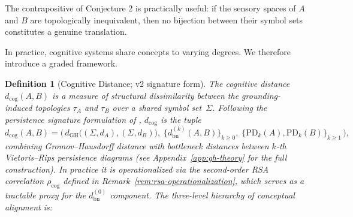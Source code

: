 \documentclass[12pt]{article}
\newtheorem{definition}{Definition}
\begin{document}
The contrapositive of Conjecture 2 is practically useful: if the
sensory spaces of $A$ and $B$ are topologically inequivalent, then no
bijection between their symbol sets constitutes a genuine translation.

In practice, cognitive systems share concepts to varying degrees.
We therefore introduce a graded framework.

\begin{definition}[Cognitive Distance; v2 signature form]
The \emph{cognitive distance} $d_\mathrm{cog}(A, B)$ is a measure of
structural dissimilarity between the grounding-induced topologies
$\tau_A$ and $\tau_B$ over a shared symbol set~$\Sigma$.
Following the persistence signature formulation of
\cite[Def.~\ref{def:dcog-signature}]{minamoto2026topology},
$d_\mathrm{cog}$ is the tuple
\[
  d_\mathrm{cog}(A, B)
  = \Big(\,
      d_\mathrm{GH}\bigl((\Sigma, d_A), (\Sigma, d_B)\bigr),\;
      \{d_\mathrm{bn}^{(k)}(A, B)\}_{k \geq 0},\;
      \{\mathrm{PD}_k(A), \mathrm{PD}_k(B)\}_{k \geq 1}\,\Big),
\]
combining Gromov--Hausdorff distance with bottleneck distances
between $k$-th Vietoris--Rips persistence diagrams
(see Appendix~\ref{app:gh-theory} for the full construction).
In practice it is operationalized via the second-order RSA
correlation $\rho_\mathrm{cog}$ defined in
Remark~\ref{rem:rsa-operationalization}, which serves as a tractable
proxy for the $d_\mathrm{bn}^{(0)}$ component.
The three-level hierarchy of conceptual alignment is:
\end{definition}
\end{document}
